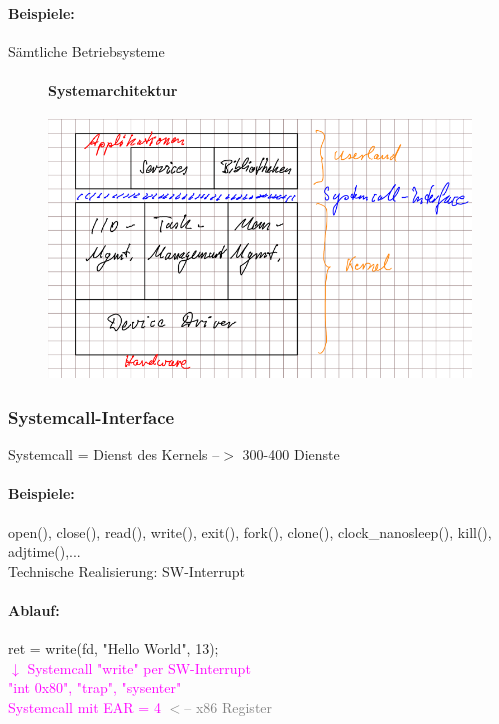 \documentclass[12pt,a4paper,oneside,ngerman]{article}
\begin{document}
\paragraph{Beispiele:}
Sämtliche Betriebsysteme

\begin{figure}[H]
	\paragraph{Systemarchitektur}
	\centering
	\includegraphics[scale=0.5]{umlet/systemarchitektur.png}
\end{figure}

\subsubsection{Systemcall-Interface}
Systemcall = Dienst des Kernels --$>$ 300-400 Dienste

\paragraph{Beispiele:}
open(), close(), read(), write(), exit(), fork(), clone(), clock\_nanosleep(), kill(), adjtime(),...\\
Technische Realisierung: SW-Interrupt

\paragraph{Ablauf:}
ret = write(fd, "Hello World", 13);\\
\textcolor{magenta}{ $\downarrow$ Systemcall "write" per SW-Interrupt}\\
\textcolor{magenta}{"int 0x80", "trap", "sysenter"}\\
\textcolor{magenta}{Systemcall mit EAR = 4} \textcolor{gray}{ $<$-- x86 Register} \\
\end{document}
